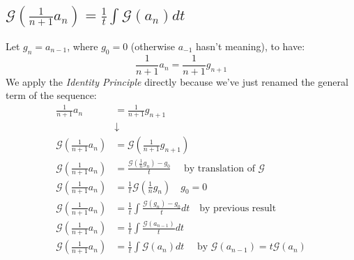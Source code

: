 \subsection{$\mathcal{G} ( \frac{1}{n+1} a_n) = \frac{1}{t} \int{
    \mathcal{G} (a_n)dt }$}

Let $g_n = a_{n-1}$, where $g_0 = 0$ (otherwise $a_{-1}$ hasn't
meaning), to have:
\begin{displaymath}
  \frac{1}{n+1} a_n = \frac{1}{n+1} g_{n+1}
\end{displaymath}
We apply the \emph{Identity Principle} directly because
we've just renamed the general term of the sequence:
\begin{displaymath}
  \begin{split}
    \frac{1}{n+1} a_n &= \frac{1}{n+1} g_{n+1} \\
    &\downarrow\\
    \mathcal{G} (\frac{1}{n+1} a_n) &= \mathcal{G} (\frac{1}{n+1}
    g_{n+1}) \\
    \mathcal{G} (\frac{1}{n+1} a_n) &= \frac{ \mathcal{G} (\frac{1}{n}
      g_n)-g_0}{t} \quad \text{ by translation of
    }\mathcal{G} \\
    \mathcal{G} (\frac{1}{n+1} a_n) &= \frac{1}{t} \mathcal{G}
    (\frac{1}{n} g_n)    \quad g_0 = 0\\
    \mathcal{G} (\frac{1}{n+1} a_n) &= \frac{1}{t} \int{
      \frac{\mathcal{G} (g_n) - g_0}{t}dt } \quad \text{by previous
      result}\\
    \mathcal{G} (\frac{1}{n+1} a_n) &= \frac{1}{t} \int{
      \frac{\mathcal{G} (a_{n-1})}{t}dt }\\
    \mathcal{G} (\frac{1}{n+1} a_n) &= \frac{1}{t} \int{ \mathcal{G}
      (a_{n})dt } \quad \text{ by } \mathcal{G} (a_{n-1}) = t
    \mathcal{G} (a_n)
  \end{split}
\end{displaymath}